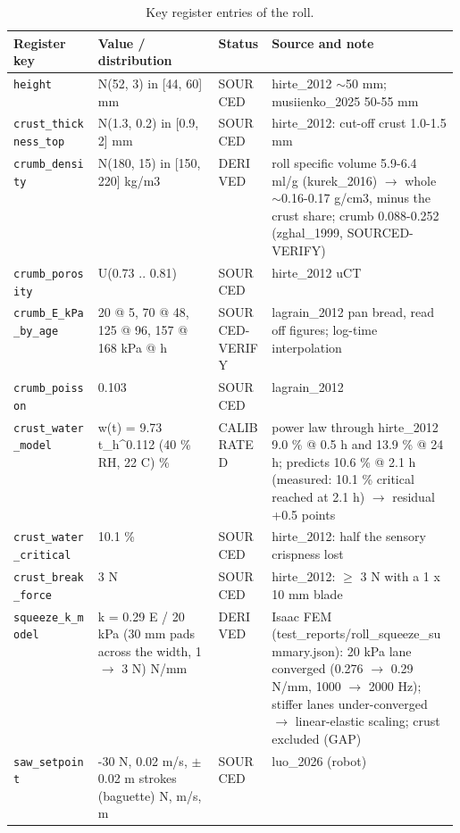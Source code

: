 \documentclass[10.5pt,a4paper]{article}
\begin{document}
\begin{table}[htbp]\centering\scriptsize\caption{Key register entries of the roll.}
\begin{tabularx}{\linewidth}{@{}p{0.19\linewidth}p{0.27\linewidth}p{0.12\linewidth}X@{}}\toprule Register key & Value / distribution & Status & Source and note \\\midrule
\texttt{height} & N(52, 3) in [44, 60] mm & SOURCED & hirte\_2012 $\sim$50 mm; musiienko\_2025 50-55 mm \\
\texttt{crust\_\allowbreak{}thickness\_\allowbreak{}top} & N(1.3, 0.2) in [0.9, 2] mm & SOURCED & hirte\_2012: cut-off crust 1.0-1.5 mm \\
\texttt{crumb\_\allowbreak{}density} & N(180, 15) in [150, 220] kg/m3 & DERIVED & roll specific volume 5.9-6.4 ml/g (kurek\_2016) $\to$ whole $\sim$0.16-0.17 g/cm3, minus the crust share; crumb 0.088-0.252 (zghal\_1999, SOURCED-VERIFY) \\
\texttt{crumb\_\allowbreak{}porosity} & U(0.73 .. 0.81) & SOURCED & hirte\_2012 uCT \\
\texttt{crumb\_\allowbreak{}E\_\allowbreak{}kPa\_\allowbreak{}by\_\allowbreak{}age} & 20 @ 5, 70 @ 48, 125 @ 96, 157 @ 168 kPa @ h & SOURCED-VERIFY & lagrain\_2012 pan bread, read off figures; log-time interpolation \\
\texttt{crumb\_\allowbreak{}poisson} & 0.103 & SOURCED & lagrain\_2012 \\
\texttt{crust\_\allowbreak{}water\_\allowbreak{}model} & w(t) = 9.73 t\_h\^{}0.112 (40 \% RH, 22 C) \% & CALIBRATED & power law through hirte\_2012 9.0 \% @ 0.5 h and 13.9 \% @ 24 h; predicts 10.6 \% @ 2.1 h (measured: 10.1 \% critical reached at 2.1 h) $\to$ residual +0.5 points \\
\texttt{crust\_\allowbreak{}water\_\allowbreak{}critical} & 10.1 \% & SOURCED & hirte\_2012: half the sensory crispness lost \\
\texttt{crust\_\allowbreak{}break\_\allowbreak{}force} & 3 N & SOURCED & hirte\_2012: $\ge$ 3 N with a 1 x 10 mm blade \\
\texttt{squeeze\_\allowbreak{}k\_\allowbreak{}model} & k = 0.29 E / 20 kPa (30 mm pads across the width, 1 $\to$ 3 N) N/mm & DERIVED & Isaac FEM (test\_reports/roll\_squeeze\_summary.json): 20 kPa lane converged (0.276 $\to$ 0.29 N/mm, 1000 $\to$ 2000 Hz); stiffer lanes under-converged $\to$ linear-elastic scaling; crust excluded (GAP) \\
\texttt{saw\_\allowbreak{}setpoint} & -30 N, 0.02 m/s, $\pm$0.02 m strokes (baguette) N, m/s, m & SOURCED & luo\_2026 (robot) \\\bottomrule\end{tabularx}\end{table}
\end{document}
